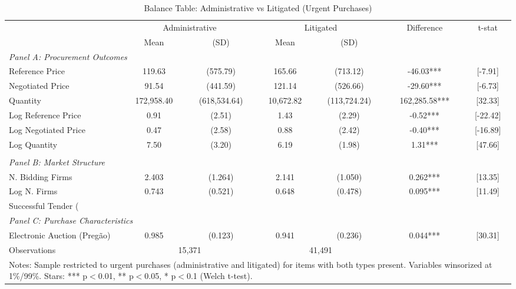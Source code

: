 \begin{table}[htbp]
\centering
\caption{Balance Table: Administrative vs Litigated (Urgent Purchases)}
\label{tab:balance}
\small
\begin{tabular}{lcccccc}
\hline\hline
 & \multicolumn{2}{c}{Administrative} & \multicolumn{2}{c}{Litigated} & Difference & t-stat \\
 & Mean & (SD) & Mean & (SD) & & \\
\hline
\multicolumn{7}{l}{\textit{Panel A: Procurement Outcomes}} \\[3pt]
  Reference Price & 119.63 & (575.79) & 165.66 & (713.12) & -46.03*** & [-7.91] \\
  Negotiated Price & 91.54 & (441.59) & 121.14 & (526.66) & -29.60*** & [-6.73] \\
  Quantity & 172,958.40 & (618,534.64) & 10,672.82 & (113,724.24) & 162,285.58*** & [32.33] \\
  Log Reference Price & 0.91 & (2.51) & 1.43 & (2.29) & -0.52*** & [-22.42] \\
  Log Negotiated Price & 0.47 & (2.58) & 0.88 & (2.42) & -0.40*** & [-16.89] \\
  Log Quantity & 7.50 & (3.20) & 6.19 & (1.98) & 1.31*** & [47.66] \\
\\[3pt]
\multicolumn{7}{l}{\textit{Panel B: Market Structure}} \\[3pt]
  N. Bidding Firms & 2.403 & (1.264) & 2.141 & (1.050) & 0.262*** & [13.35] \\
  Log N. Firms & 0.743 & (0.521) & 0.648 & (0.478) & 0.095*** & [11.49] \\
  Successful Tender (%
\\[3pt]
\multicolumn{7}{l}{\textit{Panel C: Purchase Characteristics}} \\[3pt]
  Electronic Auction (Pregão) & 0.985 & (0.123) & 0.941 & (0.236) & 0.044*** & [30.31] \\
\hline
  Observations & \multicolumn{2}{c}{15,371} & \multicolumn{2}{c}{41,491} & & \\
\hline\hline
\multicolumn{7}{p{0.90\textwidth}}{\footnotesize Notes: Sample restricted to urgent purchases (administrative and litigated) for items with both types present. Variables winsorized at 1\%/99\%. Stars: *** p$<$0.01, ** p$<$0.05, * p$<$0.1 (Welch t-test).} \\
\end{tabular}
\end{table}
